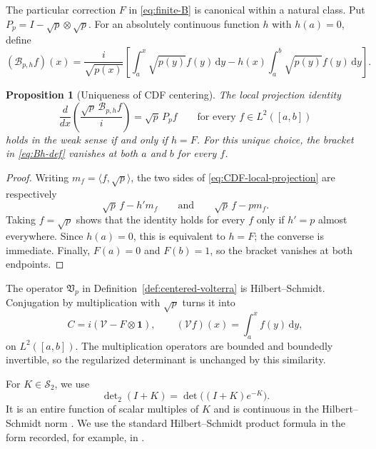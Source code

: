 \documentclass[11pt,reqno]{amsart}
\numberwithin{equation}{section}
\newtheorem{proposition}[proposition]{Proposition}
\newcommand{\1}{\mathbf 1}
\newcommand{\HS}{\mathcal S_2}
\newcommand{\Vp}{\mathfrak V_p}
\newcommand{\dd}{\,\mathrm d}
\newcommand{\detTwo}{\det\nolimits_{2}}
\begin{document}
The particular correction $F$ in \eqref{eq:finite-B} is canonical within a
natural class.  Put $P_p=I-\sqrt p\otimes\sqrt p$.  For an absolutely
continuous function $h$ with $h(a)=0$, define
\begin{equation}\label{eq:Bh-def}
 (\mathcal B_{p,h}f)(x)=\frac{i}{\sqrt{p(x)}}\left[
 \int_a^x\sqrt{p(y)}f(y)\dd y
 -h(x)\int_a^b\sqrt{p(y)}f(y)\dd y\right].
\end{equation}

\begin{proposition}[Uniqueness of CDF centering]\label{prop:CDF-uniqueness}
The local projection identity
\begin{equation}\label{eq:CDF-local-projection}
 \frac{d}{dx}\left(\frac{\sqrt p\,\mathcal B_{p,h}f}{i}\right)
 =\sqrt p\,P_pf
 \qquad\text{for every }f\in L^2([a,b])
\end{equation}
holds in the weak sense if and only if $h=F$.  For this unique choice, the
bracket in \eqref{eq:Bh-def} vanishes at both $a$ and $b$ for every $f$.
\end{proposition}

\begin{proof}
Writing $m_f=\langle f,\sqrt p\rangle$, the two sides of
\eqref{eq:CDF-local-projection} are respectively
\[
 \sqrt p\,f-h'm_f
 \qquad\text{and}\qquad
 \sqrt p\,f-pm_f.
\]
Taking $f=\sqrt p$ shows that the identity holds for every $f$ only if
$h'=p$ almost everywhere.  Since $h(a)=0$, this is equivalent to $h=F$;
the converse is immediate.  Finally, $F(a)=0$ and $F(b)=1$, so the bracket
vanishes at both endpoints.
\end{proof}

The operator $\Vp$ in Definition~\ref{def:centered-volterra} is
Hilbert--Schmidt.
Conjugation by multiplication with $\sqrt p$ turns it into
\begin{equation}\label{eq:C-similar}
 C=i(\mathcal V-F\otimes\1),
 \qquad
 (\mathcal V f)(x)=\int_a^xf(y)\dd y,
\end{equation}
on $L^2([a,b])$.  The multiplication operators are bounded and boundedly
invertible, so the regularized determinant is unchanged by this similarity.

For $K\in\HS$, we use
\begin{equation}\label{eq:det2-def}
 \detTwo(I+K)=\det\bigl((I+K)e^{-K}\bigr).
\end{equation}
It is an entire function of scalar multiples of $K$ and is continuous in the
Hilbert--Schmidt norm \cite[Chapter 9]{Simon2005}.  We use the standard
Hilbert--Schmidt product formula in the form recorded, for example, in
\cite{BritzEtAl2021}.
\end{document}
